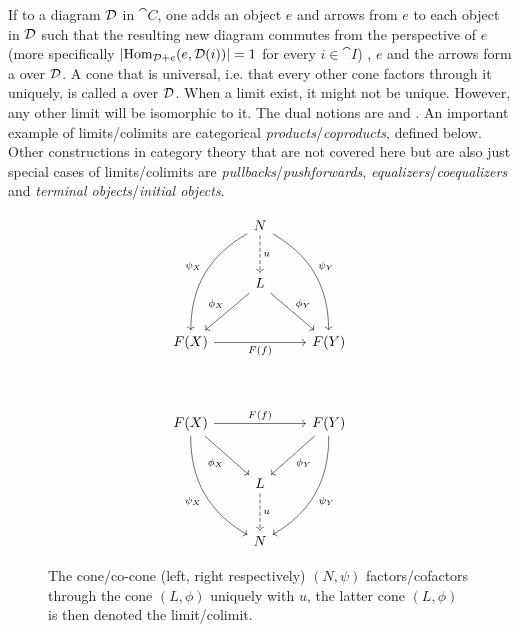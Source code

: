\documentclass[../../main.tex]{subfiles}
\begin{document}
    If to a diagram $\mathcal{D}$ in $\cat{C}$, one adds an object $e$ and arrows from $e$ to each object in $\mathcal{D}$ such that the resulting new diagram commutes from the perspective of $e$ (more specifically $|\text{Hom}_{\mathcal{D}+e}(e, \mathcal{D}(i))| = 1$ for every $i \in \cat{I}$) , $e$ and the arrows form a  over $\mathcal{D}$. A cone that is universal, i.e. that every other cone factors through it uniquely, is called a  over $\mathcal{D}$. When a limit exist, it might not be unique. However, any other limit will be isomorphic to it. The dual notions are  and . An important example of limits/colimits are categorical \emph{products}/\emph{coproducts}, defined below. Other constructions in category theory that are not covered here but are also just special cases of limits/colimits are \emph{pullbacks}/\emph{pushforwards}, \emph{equalizers}/\emph{coequalizers} and \emph{terminal objects}/\emph{initial objects}.
    
    \begin{figure}[H]
        \centering
        \begin{subfigure}[b]{0.5\textwidth}
            \[
                \begin{tikzcd}[row sep = large]
                    & N \arrow[d, "u",dashed] \arrow[ddr, bend left,"\psi_Y"]   \arrow[ddl, bend right,"\psi_X",swap] & \\
                    & L \arrow[dr, "\phi_Y"]  \arrow[dl,swap, "\phi_X"] & \\
                    F(X) \arrow[rr,swap, "F(f)"] & &  F(Y)
                \end{tikzcd}
            \]
        \end{subfigure}%
        ~
        \begin{subfigure}[b]{0.5\textwidth}
            \[
                \begin{tikzcd}[row sep = large]
                    F(X) \arrow[ddr,swap,"\psi_X",bend right] \arrow[dr,swap,"\phi_X"] \arrow[rr, "F(f)"] & &  F(Y) \arrow[dl,"\phi_Y"] \arrow[ddl,"\psi_Y",bend left]\\
                    & L \arrow[d,"u",dashed] \\
                    & N
                \end{tikzcd}
          \]
        \end{subfigure}
        \caption{The cone/co-cone (left, right respectively) $(N,\psi)$ factors/cofactors through the cone $(L,\phi)$ uniquely with $u$, the latter cone $(L,\phi)$ is then denoted the limit/colimit.}
    \end{figure}
    
\end{document}
